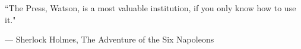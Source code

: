 \epigraph{``The Press, Watson, is a most valuable institution, if you only know how to use it."}{--- \textup{Sherlock Holmes}, The Adventure of the Six Napoleons}
